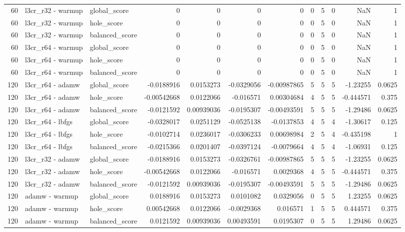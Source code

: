 \begin{tabular}{rllrrrrrrrrr}
60 & l3cr_r32 - warmup & global_score & 0 & 0 & 0 & 0 & 0 & 5 & 0 & NaN & 1 \\
60 & l3cr_r32 - warmup & hole_score & 0 & 0 & 0 & 0 & 0 & 5 & 0 & NaN & 1 \\
60 & l3cr_r32 - warmup & balanced_score & 0 & 0 & 0 & 0 & 0 & 5 & 0 & NaN & 1 \\
60 & l3cr_r64 - warmup & global_score & 0 & 0 & 0 & 0 & 0 & 5 & 0 & NaN & 1 \\
60 & l3cr_r64 - warmup & hole_score & 0 & 0 & 0 & 0 & 0 & 5 & 0 & NaN & 1 \\
60 & l3cr_r64 - warmup & balanced_score & 0 & 0 & 0 & 0 & 0 & 5 & 0 & NaN & 1 \\
120 & l3cr_r64 - adamw & global_score & -0.0188916 & 0.0153273 & -0.0329056 & -0.00987865 & 5 & 5 & 5 & -1.23255 & 0.0625 \\
120 & l3cr_r64 - adamw & hole_score & -0.00542668 & 0.0122066 & -0.016571 & 0.00304684 & 4 & 5 & 5 & -0.444571 & 0.375 \\
120 & l3cr_r64 - adamw & balanced_score & -0.0121592 & 0.00939036 & -0.0195307 & -0.00493591 & 5 & 5 & 5 & -1.29486 & 0.0625 \\
120 & l3cr_r64 - lbfgs & global_score & -0.0328017 & 0.0251129 & -0.0525138 & -0.0137853 & 4 & 5 & 4 & -1.30617 & 0.125 \\
120 & l3cr_r64 - lbfgs & hole_score & -0.0102714 & 0.0236017 & -0.0306233 & 0.00698984 & 2 & 5 & 4 & -0.435198 & 1 \\
120 & l3cr_r64 - lbfgs & balanced_score & -0.0215366 & 0.0201407 & -0.0397124 & -0.0079664 & 4 & 5 & 4 & -1.06931 & 0.125 \\
120 & l3cr_r32 - adamw & global_score & -0.0188916 & 0.0153273 & -0.0326761 & -0.00987865 & 5 & 5 & 5 & -1.23255 & 0.0625 \\
120 & l3cr_r32 - adamw & hole_score & -0.00542668 & 0.0122066 & -0.016571 & 0.0029368 & 4 & 5 & 5 & -0.444571 & 0.375 \\
120 & l3cr_r32 - adamw & balanced_score & -0.0121592 & 0.00939036 & -0.0195307 & -0.00493591 & 5 & 5 & 5 & -1.29486 & 0.0625 \\
120 & adamw - warmup & global_score & 0.0188916 & 0.0153273 & 0.0101082 & 0.0329056 & 0 & 5 & 5 & 1.23255 & 0.0625 \\
120 & adamw - warmup & hole_score & 0.00542668 & 0.0122066 & -0.0029368 & 0.016571 & 1 & 5 & 5 & 0.444571 & 0.375 \\
120 & adamw - warmup & balanced_score & 0.0121592 & 0.00939036 & 0.00493591 & 0.0195307 & 0 & 5 & 5 & 1.29486 & 0.0625 \\

\end{tabular}
